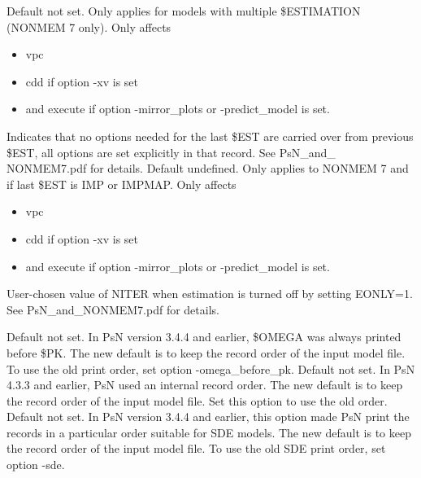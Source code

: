 \begin{optionlist}

Default not set. Only applies for models with multiple \$ESTIMATION (NONMEM 7 only). Only affects 
\begin{itemize}
\item vpc
\item cdd if option -xv is set
\item and execute if option -mirror\_plots or -predict\_model is set.
\end{itemize} 
Indicates that no options needed for the last \$EST are carried over from previous \$EST, all options are set explicitly in that record. See PsN\_and\_ NONMEM7.pdf for details. 
\nextopt
{}
Default undefined. Only applies to NONMEM 7 and if last \$EST is IMP or IMPMAP.  Only affects
\begin{itemize}
	\item vpc
	\item cdd if option -xv is set
	\item and execute if option -mirror\_plots or -predict\_model is set.
\end{itemize}
User-chosen value of NITER when estimation is turned off by setting EONLY=1. See PsN\_and\_NONMEM7.pdf for details. 

\nextopt
{}
Default not set. In PsN version 3.4.4 and earlier, \$OMEGA was always printed before \$PK. The new default is to keep the record order of the input model file. To use the old print order, set option -omega\_before\_pk.
\nextopt
{}
Default not set. In PsN 4.3.3 and earlier, PsN used an internal record order. The new default is to keep the record order of the input model file. Set this option to use the old order.
\nextopt
{}
Default not set. In PsN version 3.4.4 and earlier, this option made PsN print the records in a particular order suitable for SDE models. The new default is to keep the record order of the input model file. To use the old SDE print order, set option -sde.
\nextopt
\end{optionlist}
